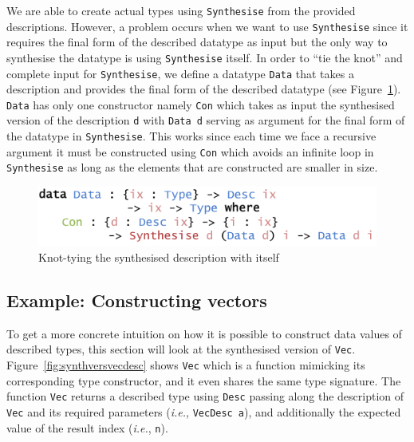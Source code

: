 \documentclass{ituthesis}
\newcommand{\ttconstructor}[1]{\textcolor{constructor-color}{\texttt{#1}}}
\newcommand{\tttype}[1]{\textcolor{type-color}{\texttt{#1}}}
\newcommand{\ttdec}[1]{\textcolor{declared-var-color}{\texttt{#1}}}
\newcommand{\ttvar}[1]{\textcolor{local-var-color}{\texttt{#1}}}
\theoremstyle{break}
\begin{document}
We are able to create actual types using \ttdec{Synthesise} from the provided descriptions.
However, a problem occurs when we want to use \ttdec{Synthesise} since it requires the final form of the described datatype as input but the only way to synthesise the datatype is using \ttdec{Synthesise} itself.
In order to ``tie the knot'' and complete input for \ttdec{Synthesise}, we define a datatype \tttype{Data} that takes a description and provides the final form of the described datatype (see Figure~\ref{fig:datafromdesc}).
\tttype{Data} has only one constructor namely \ttconstructor{Con} which takes as input the synthesised version of the description \ttvar{d} with \tttype{Data}~\ttvar{d} serving as argument for the final form of the datatype in \ttdec{Synthesise}. This works since each time we face a recursive argument it must be constructed using \ttconstructor{Con} which avoids an infinite loop in \ttdec{Synthesise} as long as the elements that are constructed are smaller in size.

\begin{figure}[ht]
\begin{center}
    \includegraphics[scale=0.5]{Figures/TyingTheSynthesisKnot.png}
\end{center}
\caption{Knot-tying the synthesised description with itself}
\label{fig:datafromdesc}
\end{figure}

\subsection{Example: Constructing vectors}
\label{sub:Example:Constructing Vectors}

To get a more concrete intuition on how it is possible to construct data values of described types, this section will look at the synthesised version of \tttype{Vec}.
Figure~\ref{fig:synthversvecdesc} shows \ttdec{Vec} which is a function mimicking its corresponding type constructor, and it even shares the same type signature.
The function \ttdec{Vec} returns a described type using \tttype{Desc} passing along the description of \tttype{Vec} and its required parameters (\textit{i.e.}, \ttdec{VecDesc}~\ttvar{a}), 
and additionally the expected value of the result index (\textit{i.e.}, \ttvar{n}).
\end{document}
